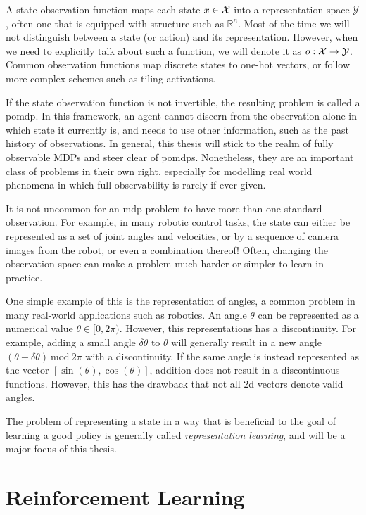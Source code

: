 A state observation function maps each state $x\in\mathcal{X}$ into a representation space $\mathcal{Y}$, often one that is equipped with structure such as $\mathbb{R}^n$.
Most of the time we will not distinguish between a state (or action) and its representation.
However, when we need to explicitly talk about such a function, we will denote it as $o: \mathcal{X} \rightarrow \mathcal{Y}$.
Common observation functions map discrete states to one-hot vectors, or follow more complex schemes such as tiling activations.

If the state observation function is not invertible, the resulting problem is called a \ac{pomdp}.
In this framework, an agent cannot discern from the observation alone in which state it currently is, and needs to use other information, such as the past history of observations.
In general, this thesis will stick to the realm of fully observable MDPs and steer clear of \acp{pomdp}.
Nonetheless, they are an important class of problems in their own right, especially for modelling real world phenomena in which full observability is rarely if ever given.

It is not uncommon for an \ac{mdp} problem to have more than one standard observation.
For example, in many robotic control tasks, the state can either be represented as a set of joint angles and velocities, or by a sequence of camera images from the robot, or even a combination thereof!
Often, changing the observation space can make a problem much harder or simpler to learn in practice.

One simple example of this is the representation of angles, a common problem in many real-world applications such as robotics.
An angle $\theta$ can be represented as a numerical value $\theta \in [0,2\pi)$.
However, this representations has a discontinuity.
For example, adding a small angle $\delta\theta$ to $\theta$ will generally result in a new angle $(\theta + \delta\theta)~\mathrm{mod}~2\pi$ with a discontinuity.
If the same angle is instead represented as the vector $[\sin(\theta),\cos(\theta)]$, addition does not result in a discontinuous functions.
However, this has the drawback that not all 2d vectors denote valid angles.

The problem of representing a state in a way that is beneficial to the goal of learning a good policy is generally called \emph{representation learning}, and will be a major focus of this thesis.


\section{Reinforcement Learning}
\label{chap:background:rl}

